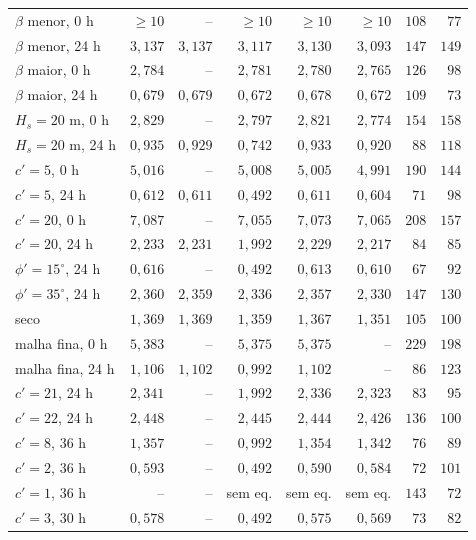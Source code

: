 \documentclass[11pt,a4paper]{article}
\numberwithin{equation}{section}
\begin{document}
{\begin{longtable}{lrrrrrrr}
$\beta$ menor, 0 h & $\ge 10$ & -- & $\ge 10$ & $\ge 10$ & $\ge 10$ & $108$ & $77$ \\
$\beta$ menor, 24 h & $3{,}137$ & $3{,}137$ & $3{,}117$ & $3{,}130$ & $3{,}093$ & $147$ & $149$ \\
$\beta$ maior, 0 h & $2{,}784$ & -- & $2{,}781$ & $2{,}780$ & $2{,}765$ & $126$ & $98$ \\
$\beta$ maior, 24 h & $0{,}679$ & $0{,}679$ & $0{,}672$ & $0{,}678$ & $0{,}672$ & $109$ & $73$ \\
$H_s = 20$ m, 0 h & $2{,}829$ & -- & $2{,}797$ & $2{,}821$ & $2{,}774$ & $154$ & $158$ \\
$H_s = 20$ m, 24 h & $0{,}935$ & $0{,}929$ & $0{,}742$ & $0{,}933$ & $0{,}920$ & $88$ & $118$ \\
$c' = 5$, 0 h & $5{,}016$ & -- & $5{,}008$ & $5{,}005$ & $4{,}991$ & $190$ & $144$ \\
$c' = 5$, 24 h & $0{,}612$ & $0{,}611$ & $0{,}492$ & $0{,}611$ & $0{,}604$ & $71$ & $98$ \\
$c' = 20$, 0 h & $7{,}087$ & -- & $7{,}055$ & $7{,}073$ & $7{,}065$ & $208$ & $157$ \\
$c' = 20$, 24 h & $2{,}233$ & $2{,}231$ & $1{,}992$ & $2{,}229$ & $2{,}217$ & $84$ & $85$ \\
$\phi' = 15^\circ$, 24 h & $0{,}616$ & -- & $0{,}492$ & $0{,}613$ & $0{,}610$ & $67$ & $92$ \\
$\phi' = 35^\circ$, 24 h & $2{,}360$ & $2{,}359$ & $2{,}336$ & $2{,}357$ & $2{,}330$ & $147$ & $130$ \\
seco & $1{,}369$ & $1{,}369$ & $1{,}359$ & $1{,}367$ & $1{,}351$ & $105$ & $100$ \\
malha fina, 0 h & $5{,}383$ & -- & $5{,}375$ & $5{,}375$ & -- & $229$ & $198$ \\
malha fina, 24 h & $1{,}106$ & $1{,}102$ & $0{,}992$ & $1{,}102$ & -- & $86$ & $123$ \\
$c' = 21$, 24 h & $2{,}341$ & -- & $1{,}992$ & $2{,}336$ & $2{,}323$ & $83$ & $95$ \\
$c' = 22$, 24 h & $2{,}448$ & -- & $2{,}445$ & $2{,}444$ & $2{,}426$ & $136$ & $100$ \\
$c' = 8$, 36 h & $1{,}357$ & -- & $0{,}992$ & $1{,}354$ & $1{,}342$ & $76$ & $89$ \\
$c' = 2$, 36 h & $0{,}593$ & -- & $0{,}492$ & $0{,}590$ & $0{,}584$ & $72$ & $101$ \\
$c' = 1$, 36 h & -- & -- & sem eq. & sem eq. & sem eq. & $143$ & $72$ \\
$c' = 3$, 30 h & $0{,}578$ & -- & $0{,}492$ & $0{,}575$ & $0{,}569$ & $73$ & $82$ \\

\end{longtable}}
\end{document}
